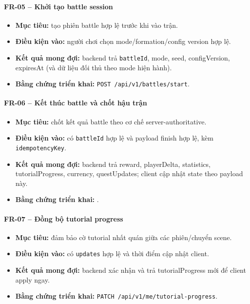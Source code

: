 \paragraph{FR-05 -- Khởi tạo battle session}
\begin{itemize}
    \item \textbf{Mục tiêu:} tạo phiên battle hợp lệ trước khi vào trận.
    \item \textbf{Điều kiện vào:} người chơi chọn mode/formation/config version hợp lệ.
    \item \textbf{Kết quả mong đợi:} backend trả \texttt{battleId}, mode, seed, configVersion, expiresAt (và dữ liệu đối thủ theo mode hiện hành).
    \item \textbf{Bằng chứng triển khai:} \texttt{POST /api/\allowbreak v1/\allowbreak battles/\allowbreak start}.
\end{itemize}

\paragraph{FR-06 -- Kết thúc battle và chốt hậu trận}
\begin{itemize}
    \item \textbf{Mục tiêu:} chốt kết quả battle theo cơ chế server-authoritative.
    \item \textbf{Điều kiện vào:} có \texttt{battleId} hợp lệ và payload finish hợp lệ, kèm \texttt{idempotencyKey}.
    \item \textbf{Kết quả mong đợi:} backend trả reward, playerDelta, statistics, tutorialProgress, currency, questUpdates; client cập nhật state theo payload này.
    \item \textbf{Bằng chứng triển khai:} .
\end{itemize}

\paragraph{FR-07 -- Đồng bộ tutorial progress}
\begin{itemize}
    \item \textbf{Mục tiêu:} đảm bảo cờ tutorial nhất quán giữa các phiên/chuyển scene.
    \item \textbf{Điều kiện vào:} có \texttt{updates} hợp lệ và thời điểm cập nhật client.
    \item \textbf{Kết quả mong đợi:} backend xác nhận và trả tutorialProgress mới để client apply ngay.
    \item \textbf{Bằng chứng triển khai:} \texttt{PATCH /api/\allowbreak v1/\allowbreak me/\allowbreak tutorial-progress}.
\end{itemize}

